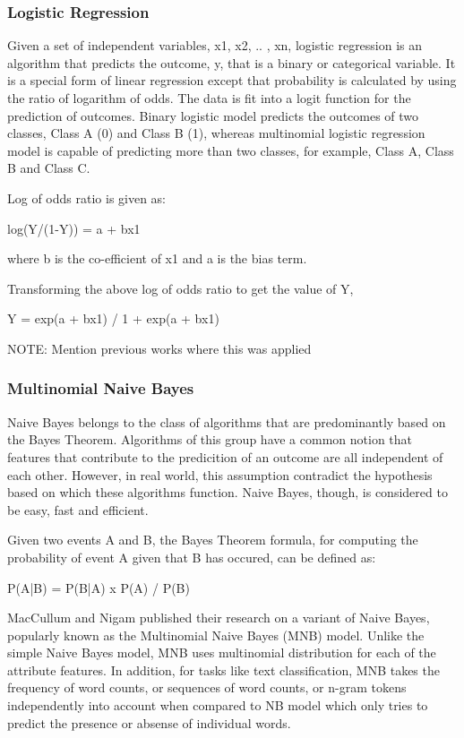 \documentclass[a4paper,12pt,twoside]{report}
\begin{document}
\subsubsection{Logistic Regression}
Given a set of independent variables, x1, x2, .. , xn, logistic regression is an algorithm that predicts the outcome, y, that is a binary or categorical variable. It is a special form of linear regression except that probability is calculated by using the ratio of logarithm of odds. The data is fit into a logit function for the prediction of outcomes. Binary logistic model predicts the outcomes of two classes, Class A (0) and Class B (1), whereas multinomial logistic regression model is capable of predicting more than two classes, for example, Class A, Class B and Class C. 

Log of odds ratio is given as:

log(Y/(1-Y)) = a + bx1

where b is the co-efficient of x1 and a is the bias term.

Transforming the above log of odds ratio to get the value of Y, 

Y = exp(a + bx1) / 1 + exp(a + bx1) 

NOTE: Mention previous works where this was applied

\subsubsection{Multinomial Naive Bayes}
Naive Bayes belongs to the class of algorithms that are predominantly based on the Bayes Theorem. Algorithms of this group have a common notion that features that contribute to the predicition of an outcome are all independent of each other. However, in real world, this assumption contradict the hypothesis based on which these algorithms function. Naive Bayes, though, is considered to be easy, fast and efficient. 

Given two events A and B, the Bayes Theorem formula, for computing the probability of event A given that B has occured, can be defined as: 

P(A|B) = P(B|A) x P(A) / P(B)

MacCullum and Nigam published their research on a variant of Naive Bayes, popularly known as the Multinomial Naive Bayes (MNB) model. Unlike the simple Naive Bayes model, MNB uses multinomial distribution for each of the attribute features. In addition, for tasks like text classification, MNB takes the frequency of word counts, or sequences of word counts, or n-gram tokens independently into account when compared to NB model which only tries to predict the presence or absense of individual words. 
\end{document}
